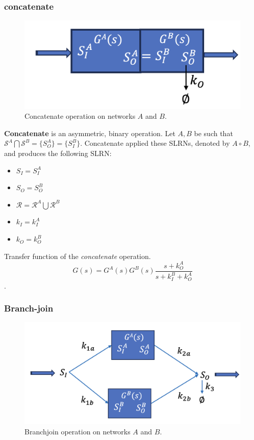 \documentclass[unnumsec,webpdf,contemporary,large]{oup-authoring-template}%
\theoremstyle{thmstyleone}%
\theoremstyle{thmstyletwo}%
\theoremstyle{thmstylethree}%
\begin{document}
\subsubsection{concatenate}
\begin{figure}
         \centering
         \includegraphics[scale=0.3]{figures/concatenate.png}
          \caption[]{Concatenate operation on networks $A$ and $B$.}
         \label{fig:concatenate}
\end{figure}

{\bf Concatenate} is an asymmetric, binary operation.
Let $A, B$ be such that $\mathcal{S}^A \bigcap \mathcal{S}^B =
\{ S^A_O \} = \{ S^B_I \}$. 
Concatenate applied these SLRNs, denoted by $A \circ  B$,
and produces
the following SLRN:
\begin{itemize}
\item $S_I =S^A_I$
\item $S_O = S^B_O$
\item $\mathcal{R} = \mathcal{R}^A \bigcup \mathcal{R}^B$
\item $k_I = k^A_I$
\item $k_O = k^B_O$
\end{itemize}

Transfer function of the {\em concatenate} operation.
$$G(s) = G^A(s) G^B(s)\frac{s + k^A_O}{s+ k^B_I + k^A_O}$$.

\subsubsection{Branch-join}
\begin{figure}
         \centering
         \includegraphics[scale=0.3]{figures/branchjoin.png}
          \caption[]{Branchjoin operation on networks $A$ and $B$.}
         \label{fig:branchjoin}
\end{figure}
\end{document}
